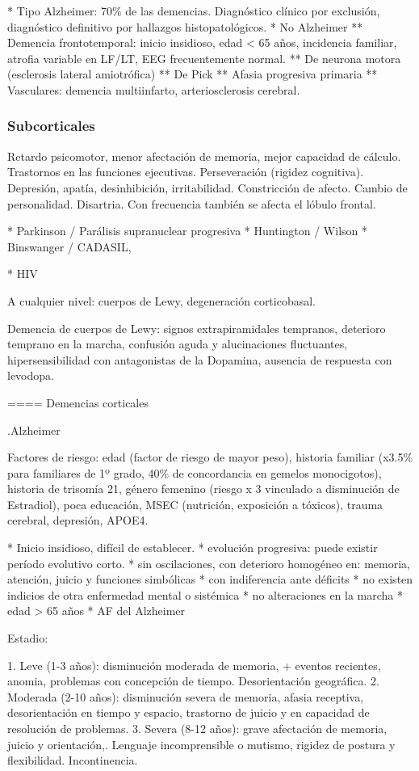 * Tipo Alzheimer: 70\% de las demencias. Diagnóstico clínico por exclusión, diagnóstico definitivo por hallazgos histopatológicos.
* No Alzheimer
** Demencia frontotemporal: inicio insidioso, edad < 65 años, incidencia familiar, atrofia variable en LF/LT, EEG frecuentemente normal.
** De neurona motora (esclerosis lateral amiotrófica)
** De Pick
** Afasia progresiva primaria
** Vasculares: demencia multiinfarto, arteriosclerosis cerebral.

\subsubsection*{Subcorticales}
Retardo psicomotor, menor afectación de memoria, mejor capacidad de cálculo. Trastornos en las funciones ejecutivas. Perseveración (rigidez cognitiva). Depresión, apatía, desinhibición, irritabilidad. Constricción de afecto. Cambio de personalidad. Disartria. Con frecuencia también se afecta el lóbulo frontal.

* Parkinson / Parálisis supranuclear progresiva
* Huntington / Wilson
* Binswanger / CADASIL,

* HIV

A cualquier nivel: cuerpos de Lewy, degeneración corticobasal.

Demencia de cuerpos de Lewy: signos extrapiramidales tempranos, deterioro temprano en la marcha, confusión aguda y alucinaciones fluctuantes, hipersensibilidad con antagonistas de la Dopamina, ausencia de respuesta con levodopa.

==== Demencias corticales

.Alzheimer

Factores de riesgo: edad (factor de riesgo de mayor peso), historia familiar (x3.5\% para familiares de 1º grado, 40\% de concordancia en gemelos monocigotos), historia de trisomía 21, género femenino (riesgo x 3 vinculado a disminución de Estradiol), poca educación, MSEC (nutrición, exposición a tóxicos), trauma cerebral, depresión, APOE4.

* Inicio insidioso, difícil de establecer.
* evolución progresiva: puede existir período evolutivo corto.
* sin oscilaciones, con deterioro homogéneo en: memoria, atención, juicio y funciones simbólicas
* con indiferencia ante déficits
* no existen indicios de otra enfermedad mental o sistémica
* no alteraciones en la marcha
* edad > 65 años
* AF del Alzheimer

Estadio:

1. Leve (1-3 años): disminución moderada de memoria, + eventos recientes, anomia, problemas con concepción de tiempo. Desorientación geográfica.
2. Moderada (2-10 años): disminución severa de memoria, afasia receptiva, desorientación en tiempo y espacio, trastorno de juicio y en capacidad de resolución de problemas.
3. Severa (8-12 años): grave afectación de memoria, juicio y orientación,. Lenguaje incomprensible o mutismo, rigidez de postura y flexibilidad. Incontinencia.

